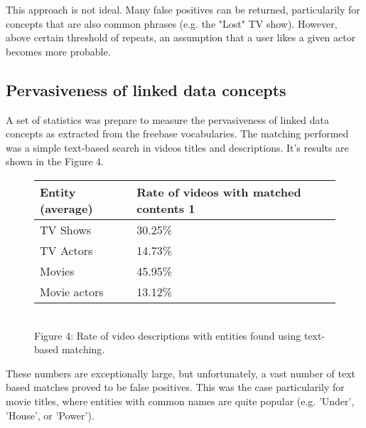 This approach is not ideal. Many false positives can be returned, particularily
for concepts that are also common phrases (e.g. the "Lost" TV show). However,
above certain threshold of repeats, an
assumption that a user likes a given actor becomes more probable.

\subsection{Pervasiveness of linked data concepts}
A set of statistics was prepare to measure the pervasiveness of linked data
concepts as extracted from the freebase vocabularies. The matching performed
was a simple text-based search in videos titles and descriptions. It's results
are shown in the Figure 4.

\begin{figure}[h!]
  \begin{center}
    \begin{tabular}{ | p{4cm} | p{6cm} | } \hline
      Entity (average) & Rate of videos with matched contents 1 \\ \hline
      TV Shows & 30.25\% \\ \hline
      TV Actors & 14.73\% \\ \hline
      Movies & 45.95\% \\ \hline
      Movie actors & 13.12\% \\ \hline
    \end{tabular} \\
    Figure 4: Rate of video descriptions with entities found using text-based matching. \\
  \end{center}
\end{figure}

These numbers are exceptionally large, but unfortunately, a vast number of text
based matches proved to be false positives. This was the case particularily for
movie titles, where entities with common names are quite popular (e.g. 'Under',
'House', or 'Power').
